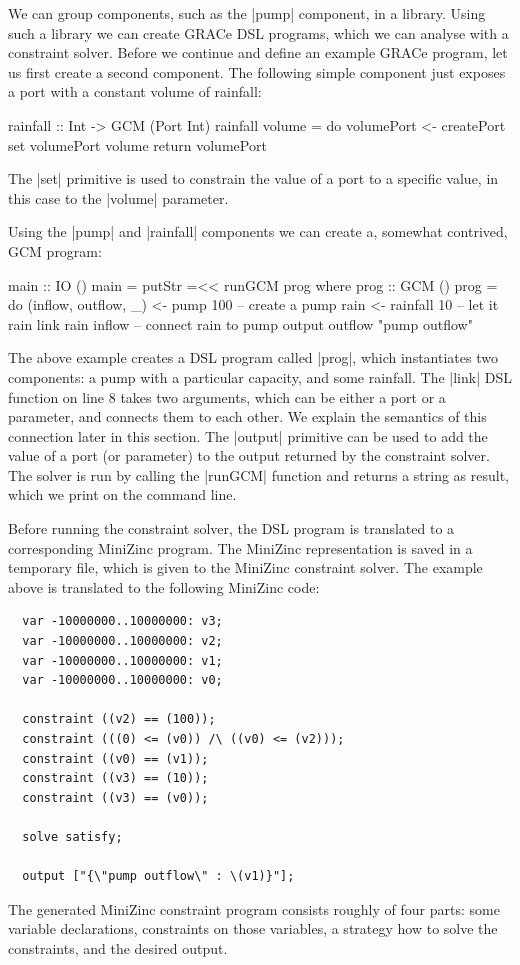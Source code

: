 \documentclass{article}
\begin{document}
We can group components, such as the |pump| component, in a library. Using such
a library we can create GRACe DSL programs, which we can analyse with a
constraint solver. Before we continue and define an example GRACe program, let
us first create a second component. The following simple component just exposes
a port with a constant volume of rainfall:
\begin{haskellcode}
rainfall :: Int -> GCM (Port Int)
rainfall volume = do
  volumePort <- createPort
  set volumePort volume
  return volumePort
\end{haskellcode}
The |set| primitive is used to constrain the value of a port to a specific value,
in this case to the |volume| parameter. 

Using the |pump| and |rainfall| components we can create a, somewhat contrived,
\ac{GCM} program:
\begin{haskellcode}
main :: IO ()
main = putStr =<< runGCM prog
  where
    prog :: GCM ()
    prog = do
      (inflow, outflow, _) <- pump 100  -- create a pump
      rain <- rainfall 10               -- let it rain
      link rain inflow                  -- connect rain to pump
      output outflow "pump outflow"
\end{haskellcode}
The above example creates a DSL program called |prog|, which instantiates two
components: a pump with a particular capacity, and some rainfall. The |link| DSL
function on line 8 takes two arguments, which can be either a port or a parameter, and
connects them to each other. We explain the semantics of this connection later in
this section. The |output| primitive can be used to add the value
of a port (or parameter) to the output returned by the constraint solver. The
solver is run by calling the |runGCM| function and returns a string as result,
which we print on the command line.

Before running the constraint solver, the DSL program is translated to a 
corresponding MiniZinc program. The MiniZinc representation is saved in a 
temporary file, which is given to the MiniZinc constraint solver. The example 
above is translated to the following MiniZinc code:
%
\begin{verbatim}
  var -10000000..10000000: v3;
  var -10000000..10000000: v2;
  var -10000000..10000000: v1;
  var -10000000..10000000: v0;

  constraint ((v2) == (100));
  constraint (((0) <= (v0)) /\ ((v0) <= (v2)));
  constraint ((v0) == (v1));
  constraint ((v3) == (10));
  constraint ((v3) == (v0));

  solve satisfy;

  output ["{\"pump outflow\" : \(v1)}"];
\end{verbatim}
%
The generated MiniZinc constraint program consists roughly of four parts: some
variable declarations, constraints on those variables, a strategy how to solve
the constraints, and the desired output. 
\end{document}
